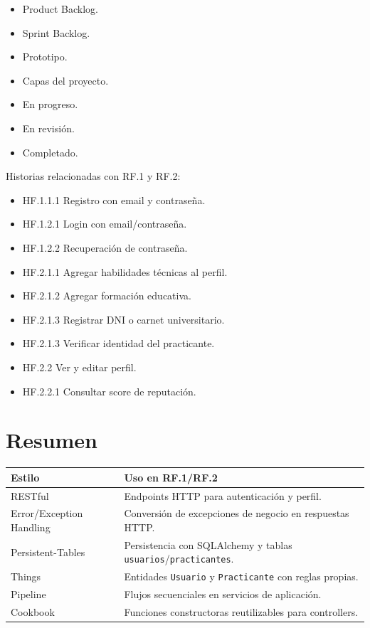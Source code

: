 \documentclass[12pt,a4paper]{article}
\begin{document}
\begin{itemize}
    \item Product Backlog.
    \item Sprint Backlog.
    \item Prototipo.
    \item Capas del proyecto.
    \item En progreso.
    \item En revisión.
    \item Completado.
\end{itemize}

Historias relacionadas con RF.1 y RF.2:

\begin{itemize}
    \item HF.1.1.1 Registro con email y contraseña.
    \item HF.1.2.1 Login con email/contraseña.
    \item HF.1.2.2 Recuperación de contraseña.
    \item HF.2.1.1 Agregar habilidades técnicas al perfil.
    \item HF.2.1.2 Agregar formación educativa.
    \item HF.2.1.3 Registrar DNI o carnet universitario.
    \item HF.2.1.3 Verificar identidad del practicante.
    \item HF.2.2 Ver y editar perfil.
    \item HF.2.2.1 Consultar score de reputación.
\end{itemize}

\section{Resumen}

\begin{longtable}{|p{4cm}|p{10cm}|}
\hline
\textbf{Estilo} & \textbf{Uso en RF.1/RF.2} \\
\hline
RESTful & Endpoints HTTP para autenticación y perfil. \\
\hline
Error/Exception Handling & Conversión de excepciones de negocio en respuestas HTTP. \\
\hline
Persistent-Tables & Persistencia con SQLAlchemy y tablas \texttt{usuarios}/\texttt{practicantes}. \\
\hline
Things & Entidades \texttt{Usuario} y \texttt{Practicante} con reglas propias. \\
\hline
Pipeline & Flujos secuenciales en servicios de aplicación. \\
\hline
Cookbook & Funciones constructoras reutilizables para controllers. \\
\hline
\end{longtable}
\end{document}
